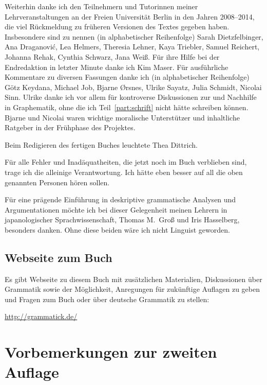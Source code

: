 Weiterhin danke ich den Teilnehmern und Tutorinnen meiner Lehrveranstaltungen an der Freien Universität Berlin in den Jahren 2008--2014, die viel Rückmeldung zu früheren Versionen des Textes gegeben haben.
Insbesondere sind zu nennen (in alphabetischer Reihenfolge) Sarah Dietzfelbinger, Ana Draganovi\'{c}, Lea Helmers, Theresia Lehner, Kaya Triebler, Samuel Reichert, Johanna Rehak, Cynthia Schwarz, Jana Weiß.
Für ihre Hilfe bei der Endredaktion in letzter Minute danke ich Kim Maser.
Für ausführliche Kommentare zu diversen Fassungen danke ich (in alphabetischer Reihenfolge) Götz Keydana, Michael Job, Bjarne Ørsnes, Ulrike Sayatz, Julia Schmidt, Nicolai Sinn.
Ulrike danke ich vor allem für kontroverse Diskussionen zur und Nachhilfe in Graphematik, ohne die ich Teil~\ref{part:schrift} nicht hätte schreiben können.
Bjarne und Nicolai waren wichtige moralische Unterstützer und inhaltliche Ratgeber in der Frühphase des Projektes.

Beim Redigieren des fertigen Buches leuchtete Thea Dittrich.

Für alle Fehler und Inadäquatheiten, die jetzt noch im Buch verblieben sind, trage ich die alleinige Verantwortung.
Ich hätte eben besser auf all die oben genannten Personen hören sollen.

Für eine prägende Einführung in deskriptive grammatische Analysen und Argumentationen möchte ich bei dieser Gelegenheit meinen Lehrern in japanologischer Sprachwissenschaft, Thomas M.\ Groß und Iris Hasselberg, besonders danken.
Ohne diese beiden wäre ich nicht Linguist geworden.

\newpage

\section*{Webseite zum Buch}

Es gibt Webseite zu diesem Buch mit zusätzlichen Materialien, Diskussionen über Grammatik sowie der Möglichkeit, Anregungen für zukünftige Auflagen zu geben und Fragen zum Buch oder über deutsche Grammatik zu stellen:

\begin{center}
  \url{http://grammatick.de/}
\end{center}



\chapter*{Vorbemerkungen zur zweiten Auflage}

